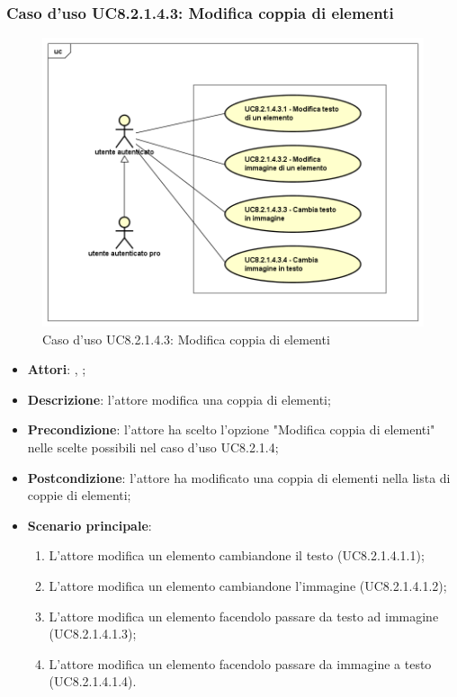 	\subsubsection{Caso d'uso UC8.2.1.4.3: Modifica coppia di elementi}
	\label{UC8.2.1.4.3}
	\begin{figure}[h]
		\centering
		\includegraphics[scale=0.5,keepaspectratio]{UML/UC8_2_1_4_3.png}
		\caption{Caso d'uso UC8.2.1.4.3: Modifica coppia di elementi}
	\end{figure}
	\FloatBarrier
	\begin{itemize}
		\item \textbf{Attori}: \uau, \uaupro;
		\item \textbf{Descrizione}: l'attore modifica una coppia di elementi;
		\item \textbf{Precondizione}: l'attore ha scelto l'opzione "Modifica coppia di elementi" nelle scelte possibili nel caso d'uso UC8.2.1.4;
		\item \textbf{Postcondizione}: l'attore ha modificato una coppia di elementi nella lista di coppie di elementi; 
		\item \textbf{Scenario principale}: 
		\begin{enumerate}
			\item L'attore modifica un elemento cambiandone il testo (UC8.2.1.4.1.1);
			\item L'attore modifica un elemento cambiandone l'immagine (UC8.2.1.4.1.2);
			\item L'attore modifica un elemento facendolo passare da testo ad immagine (UC8.2.1.4.1.3);
			\item L'attore modifica un elemento facendolo passare da immagine a testo (UC8.2.1.4.1.4).	
		\end{enumerate}
	\end{itemize}
	

